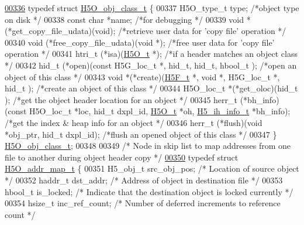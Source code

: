 \begin{DoxyCode}
\hyperlink{struct_h5_o__obj__class__t}{00336} \textcolor{keyword}{typedef} \textcolor{keyword}{struct }\hyperlink{struct_h5_o__obj__class__t}{H5O\_obj\_class\_t} \{
00337     H5O\_type\_t  type;               \textcolor{comment}{/*object type on disk        */}
00338     \textcolor{keyword}{const} \textcolor{keywordtype}{char}  *name;              \textcolor{comment}{/*for debugging          */}
00339     \textcolor{keywordtype}{void}       *(*get\_copy\_file\_udata)(void);   \textcolor{comment}{/*retrieve user data for 'copy file' operation */}
00340     void    (*free\_copy\_file\_udata)(\textcolor{keywordtype}{void} *); \textcolor{comment}{/*free user data for 'copy file' operation */}
00341     htri\_t  (*isa)(\hyperlink{struct_h5_o__t}{H5O\_t} *);       \textcolor{comment}{/*if a header matches an object class */}
00342     hid\_t   (*open)(\textcolor{keyword}{const} H5G\_loc\_t *, hid\_t, hid\_t, hbool\_t ); \textcolor{comment}{/*open an object of this class */}
00343     \textcolor{keywordtype}{void}    *(*create)(\hyperlink{struct_h5_f__t}{H5F\_t} *, \textcolor{keywordtype}{void} *, H5G\_loc\_t *, hid\_t );  \textcolor{comment}{/*create an object of this class */}
00344     H5O\_loc\_t   *(*get\_oloc)(hid\_t );       \textcolor{comment}{/*get the object header location for an object */}
00345     herr\_t      (*bh\_info)(\textcolor{keyword}{const} H5O\_loc\_t *loc, hid\_t dxpl\_id, \hyperlink{struct_h5_o__t}{H5O\_t} *oh, 
      \hyperlink{struct_h5__ih__info__t}{H5\_ih\_info\_t} *bh\_info); \textcolor{comment}{/*get the index & heap info for an object */}
00346     herr\_t      (*flush)(\textcolor{keywordtype}{void} *obj\_ptr, hid\_t dxpl\_id); \textcolor{comment}{/*flush an opened object of this class */}
00347 \} \hyperlink{struct_h5_o__obj__class__t}{H5O\_obj\_class\_t};
00348 
00349 \textcolor{comment}{/* Node in skip list to map addresses from one file to another during object header copy */}
\hyperlink{struct_h5_o__addr__map__t}{00350} \textcolor{keyword}{typedef} \textcolor{keyword}{struct }\hyperlink{struct_h5_o__addr__map__t}{H5O\_addr\_map\_t} \{
00351     H5\_obj\_t    src\_obj\_pos;            \textcolor{comment}{/* Location of source object */}
00352     haddr\_t     dst\_addr;               \textcolor{comment}{/* Address of object in destination file */}
00353     hbool\_t     is\_locked;              \textcolor{comment}{/* Indicate that the destination object is locked currently */}
00354     hsize\_t     inc\_ref\_count;          \textcolor{comment}{/* Number of deferred increments to reference count */}

\end{DoxyCode}
